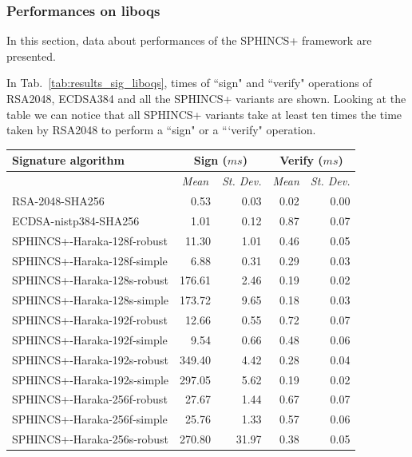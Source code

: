\documentclass[a4paper,12pt]{article}
\def\mytab#1{Tab.~#1\xspace}
\begin{document}
\subsubsection{Performances on liboqs}
\label{subsub:perf_liboqs}

In this section, data about performances of the SPHINCS+ framework are presented.

In \mytab{\ref{tab:results_sig_liboqs}}, times of ``sign" and ``verify" operations of RSA2048, ECDSA384 and all the SPHINCS+ variants are shown. Looking at the table we can notice that all SPHINCS+ variants take at least ten times the time taken by RSA2048 to perform a ``sign" or a ```verify" operation. 

\begin{table}[]
\centering
\begin{tabular}{@{}lrrrr@{}}
\toprule
\textbf{Signature algorithm}  & \multicolumn{2}{c}{\textbf{Sign ($ms$)}} & \multicolumn{2}{c}{\textbf{Verify ($ms$)}}        \\ \midrule
                              & \multicolumn{1}{c}{\textit{Mean}}               & \multicolumn{1}{c}{\textit{St. Dev.}}  & \multicolumn{1}{c}{\textit{Mean}}        & \multicolumn{1}{c}{\textit{St. Dev.}} \\ \hline
RSA-2048-SHA256      & 0.53 & 0.03 & 0.02 & 0.00 \\
ECDSA-nistp384-SHA256 & 1.01  & 0.12  & 0.87  & 0.07          \\ \hline
SPHINCS+-Haraka-128f-robust & 11.30   & 1.01  & 0.46 & 0.05 \\
SPHINCS+-Haraka-128f-simple & 6.88   & 0.31  & 0.29 & 0.03 \\
SPHINCS+-Haraka-128s-robust & 176.61 & 2.46  & 0.19 & 0.02 \\
SPHINCS+-Haraka-128s-simple & 173.72 & 9.65  & 0.18 & 0.03 \\
SPHINCS+-Haraka-192f-robust & 12.66  & 0.55  & 0.72 & 0.07 \\
SPHINCS+-Haraka-192f-simple & 9.54   & 0.66  & 0.48 & 0.06 \\
SPHINCS+-Haraka-192s-robust & 349.40  & 4.42  & 0.28 & 0.04 \\
SPHINCS+-Haraka-192s-simple & 297.05 & 5.62  & 0.19 & 0.02 \\
SPHINCS+-Haraka-256f-robust & 27.67  & 1.44  & 0.67 & 0.07 \\
SPHINCS+-Haraka-256f-simple & 25.76  & 1.33  & 0.57 & 0.06 \\
SPHINCS+-Haraka-256s-robust & 270.80  & 31.97 & 0.38 & 0.05 \\

\end{tabular}
\end{table}
\end{document}
